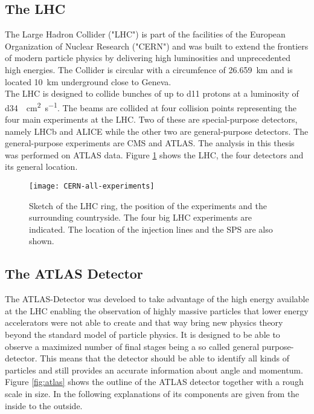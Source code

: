 \subsection{The LHC}

The Large Hadron Collider ("LHC") is part of the facilities of the European Organization of Nuclear Research ("CERN") and was built to extend the frontiers of modern particle physics by delivering high luminosities and unprecedented high energies. The Collider is circular with a circumfence of \SI{26.659}{\km} and is located \SI{10}{\km} underground close to Geneva.\\
The LHC is designed to collide bunches of up to \num{d11} protons at a luminosity of \SI{d34}{\per\square\cm \per\s}. The beams are collided at four collision points representing the four main experiments at the LHC. Two of these are special-purpose detectors, namely LHCb and ALICE while the other two are general-purpose detectors.
The general-purpose experiments are CMS and ATLAS. The analysis in this thesis was performed on ATLAS data.
Figure \ref{fig:LHC} shows the LHC, the four detectors and its general location.
\begin{figure}[h]
  \centering
  \texttt{[image: CERN-all-experiments]}
  \caption[Sketch of the LHC ring, the position of the experiments and
  the surrounding countryside.]{Sketch of the LHC ring, the position
    of the experiments and the surrounding countryside. The four big
    LHC experiments are indicated. The location of the injection lines
    and the SPS are also shown. \cite{atlasfigures}}
  \label{fig:LHC}
\end{figure}


\subsection{The ATLAS Detector}

The ATLAS-Detector was develoed to take advantage of the high energy available at the LHC enabling the observation of highly massive particles that lower energy accelerators were not able to create and that way bring new physics theory beyond the standard model of particle physics.
It is designed to be able to observe a maximized number of final stages being a so called general purpose-detector. This means that the detector should be able to identify all kinds of particles and still provides an accurate information about angle and momentum.
Figure \ref{fig:atlas} shows the outline of the ATLAS detector together with a rough scale in size. In the following explanations of its components are given from the inside to the outside.

